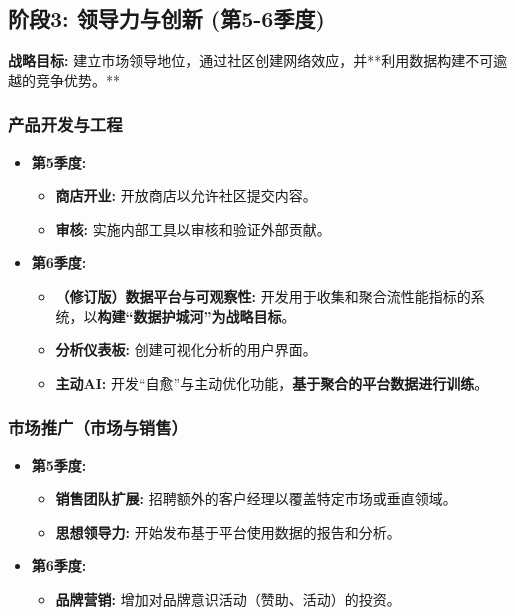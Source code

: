 \documentclass[11pt, a4paper, oneside]{article}
\begin{document}
\clearpage

\subsection{阶段3: 领导力与创新 (第5-6季度)}
\textbf{战略目标:} 建立市场领导地位，通过社区创建网络效应，并**利用数据构建不可逾越的竞争优势。**

\subsubsection*{产品开发与工程}
\begin{itemize}[leftmargin=*]
    \item \textbf{第5季度:}
    \begin{itemize}
        \item \textbf{商店开业:} 开放商店以允许社区提交内容。
        \item \textbf{审核:} 实施内部工具以审核和验证外部贡献。
    \end{itemize}
    \item \textbf{第6季度:}
    \begin{itemize}
        \item \textbf{（修订版）数据平台与可观察性:} 开发用于收集和聚合流性能指标的系统，以\textbf{构建“数据护城河”为战略目标}。
        \item \textbf{分析仪表板:} 创建可视化分析的用户界面。
        \item \textbf{主动AI:} 开发“自愈”与主动优化功能，\textbf{基于聚合的平台数据进行训练}。
    \end{itemize}
\end{itemize}

\subsubsection*{市场推广（市场与销售）}
\begin{itemize}[leftmargin=*]
    \item \textbf{第5季度:}
    \begin{itemize}
        \item \textbf{销售团队扩展:} 招聘额外的客户经理以覆盖特定市场或垂直领域。
        \item \textbf{思想领导力:} 开始发布基于平台使用数据的报告和分析。
    \end{itemize}
    \item \textbf{第6季度:}
    \begin{itemize}
        \item \textbf{品牌营销:} 增加对品牌意识活动（赞助、活动）的投资。
    \end{itemize}
\end{itemize}
\end{document}
